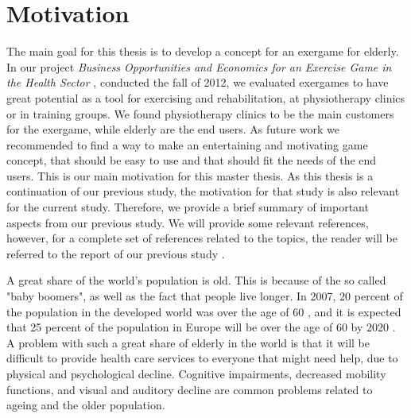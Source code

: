 \chapter{Motivation}
\label{chap:background}

The main goal for this thesis is to develop a concept for an exergame for elderly. In our project \emph{Business Opportunities and Economics for an Exercise Game in the Health Sector} \cite{project}, conducted the fall of 2012, we evaluated exergames to have great potential as a tool for exercising and rehabilitation, at physiotherapy clinics or in training groups. We found physiotherapy clinics to be the main customers for the exergame, while elderly are the end users. As future work we recommended to find a way to make an entertaining and motivating game concept, that should be easy to use and that should fit the needs of the end users. This is our main motivation for this master thesis. As this thesis is a continuation of our previous study, the motivation for that study is also relevant for the current study. Therefore, we provide a brief summary of important aspects from our previous study. We will provide some relevant references, however, for a complete set of references related to the topics, the reader will be referred to the report of our previous study \cite{project}.

A great share of the world's population is old. This is because of the so called "baby boomers", as well as the fact that people live longer. In 2007, 20 percent of the population in the developed world was over the age of 60 \cite{dickinson2007methods}, and it is expected that 25 percent of the population in Europe will be over the age of 60 by 2020 \cite{ijsselsteijn2007digital}. A problem with such a great share of elderly in the world is that it will be difficult to provide health care services to everyone that might need help, due to physical and psychological decline. Cognitive impairments, decreased mobility functions, and visual and auditory decline are common problems related to ageing and the older population.

